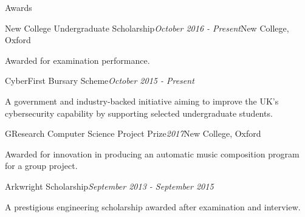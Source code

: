 \documentclass{resume} %
\begin{document}
\begin{rSection}{Awards} \itemsep -2pt

\begin{rSubsection}{New College Undergraduate Scholarship}{\em October 2016 - Present}{}{New College, Oxford}
	\item Awarded for examination performance.
\end{rSubsection}


\begin{rSubsection}{CyberFirst Bursary Scheme}{\em October 2015 - Present}{}{}
	\item A government and industry-backed initiative aiming to improve the UK's cybersecurity capability by supporting selected undergraduate students.
\end{rSubsection}


\begin{rSubsection}{GResearch Computer Science Project Prize}{\em 2017}{}{New College, Oxford}
	\item Awarded for innovation in producing an automatic music composition program for a group project.
\end{rSubsection}


\begin{rSubsection}{Arkwright Scholarship}{\em September 2013 - September 2015}{}{}
	\item A prestigious engineering scholarship awarded after examination and interview.
\end{rSubsection}

\end{rSection}

\end{document}
